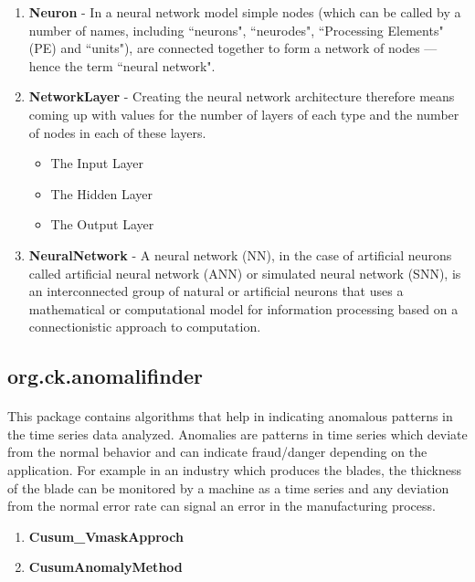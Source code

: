 \documentclass[12pt,a4paper]{report}
\begin{document}
\begin{enumerate}

\item{\textbf{Neuron}} - In a neural network model simple nodes (which can be called by a number of names, including ``neurons", ``neurodes", ``Processing Elements" (PE) and ``units"), are connected together to form a network of nodes — hence the term ``neural network".
\item{\textbf{NetworkLayer}} - Creating the neural network architecture therefore means coming up with values for the number of layers of each type and the number of nodes in each of these layers.

\begin{itemize}
\item{The Input Layer}
\item{The Hidden Layer}
\item{The Output Layer}
\end{itemize}


\item{\textbf{NeuralNetwork}} - A neural network (NN), in the case of artificial neurons called artificial neural network (ANN) or simulated neural network (SNN), is an interconnected group of natural or artificial neurons that uses a mathematical or computational model for information processing based on a connectionistic approach to computation.


\end{enumerate}

\subsection{org.ck.anomalifinder}
\paragraph{} This package contains algorithms that help in indicating anomalous patterns in the time series data analyzed. Anomalies are patterns in time series which deviate from the normal behavior and can indicate fraud/danger depending on the application. For example in an industry which produces the blades, the thickness of the blade can be monitored by a machine as a time series and any deviation from the normal error rate can signal an error in the manufacturing process.

\begin{enumerate}

\item{\textbf{Cusum\_VmaskApproch}}

\item{\textbf{CusumAnomalyMethod}}

\end{enumerate}
\end{document}
